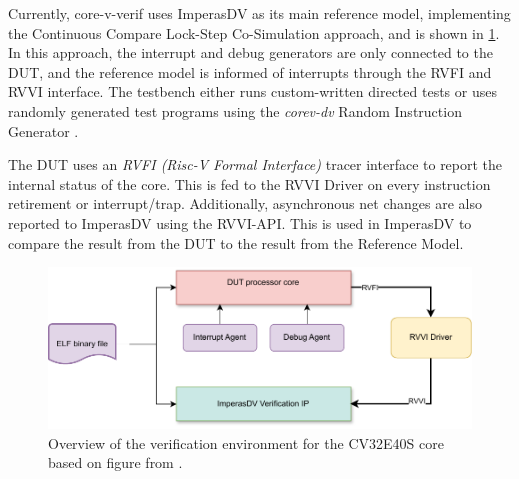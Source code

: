 Currently, core-v-verif uses ImperasDV as its main reference model, implementing the Continuous Compare Lock-Step Co-Simulation approach\cite{duncangrahamRISCVVerificationImplications2023}, and is shown in \cref{fig:cv32e40s-overview}. In this approach, the interrupt and debug generators are only connected to the DUT, and the reference model is informed of interrupts through the RVFI and RVVI interface. 
The testbench either runs custom-written directed tests or uses randomly generated test programs using the \textit{corev-dv} Random Instruction Generator
\cite{openhwgroupOpenhwgroupCorevverif2023}.

The DUT uses an \textit{RVFI (Risc-V Formal Interface)} tracer interface to report the internal status of the core\cite{symbioticedaRiscvformalDocsRvfi2020}. This is fed to the RVVI Driver on every instruction retirement or interrupt/trap. Additionally, asynchronous net changes are also reported to ImperasDV using the RVVI-API. This is used in ImperasDV to compare the result from the DUT to the result from the Reference Model. 


\begin{figure}
    \centering
    \includegraphics[width=0.75\linewidth]{figures/core-v-verif.pdf}
    \caption{Overview of the verification environment for the CV32E40S core based on figure from \cite{openhwgroupOpenhwgroupCorevverif2023}.}
    \label{fig:cv32e40s-overview}
\end{figure}



%
%    




